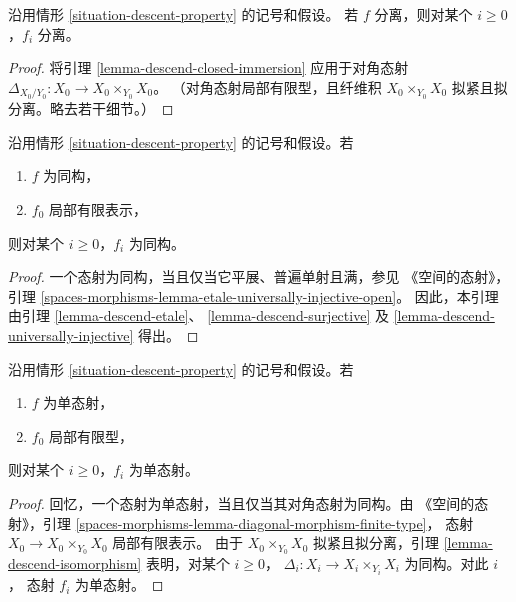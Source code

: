 \begin{lemma}
\label{lemma-descend-separated-morphism}
沿用情形 \ref{situation-descent-property} 的记号和假设。
若 $f$ 分离，则对某个 $i \geq 0$，$f_i$ 分离。
\end{lemma}

\begin{proof}
将引理 \ref{lemma-descend-closed-immersion} 应用于对角态射
$\Delta_{X_0/Y_0} : X_0 \to X_0 \times_{Y_0} X_0$。
（对角态射局部有限型，且纤维积
$X_0 \times_{Y_0} X_0$ 拟紧且拟分离。略去若干细节。）
\end{proof}

\begin{lemma}
\label{lemma-descend-isomorphism}
沿用情形 \ref{situation-descent-property} 的记号和假设。若
\begin{enumerate}
\item $f$ 为同构，
\item $f_0$ 局部有限表示，
\end{enumerate}
则对某个 $i \geq 0$，$f_i$ 为同构。
\end{lemma}

\begin{proof}
一个态射为同构，当且仅当它平展、普遍单射且满，参见
《空间的态射》，引理
\ref{spaces-morphisms-lemma-etale-universally-injective-open}。
因此，本引理由引理 \ref{lemma-descend-etale}、
\ref{lemma-descend-surjective} 及
\ref{lemma-descend-universally-injective} 得出。
\end{proof}

\begin{lemma}
\label{lemma-descend-monomorphism}
沿用情形 \ref{situation-descent-property} 的记号和假设。若
\begin{enumerate}
\item $f$ 为单态射，
\item $f_0$ 局部有限型，
\end{enumerate}
则对某个 $i \geq 0$，$f_i$ 为单态射。
\end{lemma}

\begin{proof}
回忆，一个态射为单态射，当且仅当其对角态射为同构。由
《空间的态射》，引理
\ref{spaces-morphisms-lemma-diagonal-morphism-finite-type}，
态射 $X_0 \to X_0 \times_{Y_0} X_0$ 局部有限表示。
由于 $X_0 \times_{Y_0} X_0$ 拟紧且拟分离，引理
\ref{lemma-descend-isomorphism} 表明，对某个 $i \geq 0$，
$\Delta_i : X_i \to X_i \times_{Y_i} X_i$ 为同构。对此 $i$，
态射 $f_i$ 为单态射。
\end{proof}

